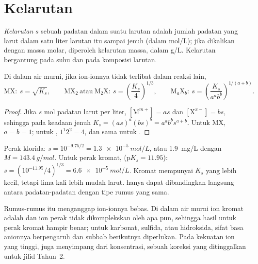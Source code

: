 \section{Kelarutan}

\begin{definition}[Kelarutan]\label{def:b1:precipitation:solubility}
\emph{Kelarutan} $s$ sebuah padatan dalam suatu larutan
adalah jumlah padatan yang larut dalam satu liter larutan itu sampai
jenuh (dalam \unit{mol/L}); jika dikalikan dengan massa molar, diperoleh
kelarutan massa, dalam \unit{g/L}. Kelarutan bergantung pada suhu dan
pada komposisi larutan.
\end{definition}

\begin{proposition}\label{prop:b1:precipitation:s-of-ks}
Di dalam air murni, jika ion-ionnya tidak terlibat dalam reaksi lain,
\[
  \mathrm{MX}:\ s = \sqrt{K_s}, \qquad
  \mathrm{MX_2}\ \text{atau}\ \mathrm{M_2X}:\ s = \left(\frac{K_s}{4}\right)^{1/3},
  \qquad
  \mathrm{M}_a\mathrm{X}_b:\ s = \left(\frac{K_s}{a^a b^b}\right)^{1/(a+b)} .
\]
\end{proposition}

\begin{proof}
Jika $s$ mol padatan larut per liter, $[\mathrm{M}^{m+}] = as$ dan
$[\mathrm{X}^{x-}] = bs$, sehingga pada keadaan jenuh $K_s = (as)^a(bs)^b =
a^a b^b s^{a+b}$. Untuk MX, $a = b = 1$; untuk , $1^1 2^2 = 4$, dan
sama untuk .
\end{proof}

\begin{example}\label{ex:b1:precipitation:agcl-ag2cro4}
Perak klorida: $s = 10^{-9.75/2} = \qty{1.3e-5}{mol/L}$, atau
\qty{1.9}{mg/L} dengan $M = \qty{143.4}{g/mol}$. Untuk perak kromat, 
($\mathrm{p}K_s = 11.95$): $s = (10^{-11.95}/4)^{1/3} =
\qty{6.6e-5}{mol/L}$. Kromat mempunyai $K_s$ yang lebih kecil, tetapi
lima kali lebih mudah larut.  hanya dapat
dibandingkan langsung antara padatan-padatan dengan tipe rumus yang sama.
\end{example}

\begin{remark}
Rumus-rumus itu menganggap ion-ionnya bebas. Di dalam air murni ion
kromat adalah  dan ion perak tidak dikomplekskan oleh apa pun,
sehingga hasil untuk perak kromat hampir benar; untuk karbonat, sulfida,
atau hidroksida, sifat basa anionnya berpengaruh dan subbab berikutnya
diperlukan. Pada kekuatan ion yang tinggi,  juga menyimpang dari
konsentrasi, sebuah koreksi yang ditinggalkan untuk jilid Tahun~2.
\end{remark}

